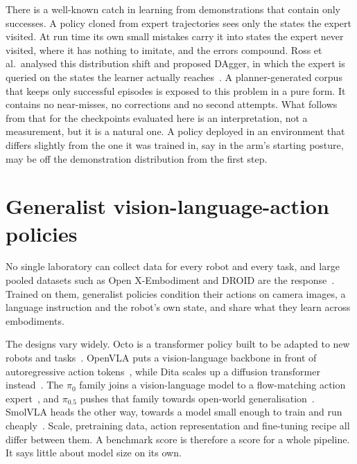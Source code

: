 There is a well-known catch in learning from demonstrations that contain only successes. A policy cloned from expert trajectories sees only the states the expert visited. At run time its own small mistakes carry it into states the expert never visited, where it has nothing to imitate, and the errors compound. Ross et al.\ analysed this distribution shift and proposed DAgger, in which the expert is queried on the states the learner actually reaches~\cite{ross2011dagger}. A planner-generated corpus that keeps only successful episodes is exposed to this problem in a pure form. It contains no near-misses, no corrections and no second attempts. What follows from that for the checkpoints evaluated here is an interpretation, not a measurement, but it is a natural one. A policy deployed in an environment that differs slightly from the one it was trained in, say in the arm's starting posture, may be off the demonstration distribution from the first step.

\section{Generalist vision-language-action policies}

No single laboratory can collect data for every robot and every task, and large pooled datasets such as Open X-Embodiment and DROID are the response~\cite{open_x_embodiment_rt_x_2023,khazatsky2024droid}. Trained on them, generalist policies condition their actions on camera images, a language instruction and the robot's own state, and share what they learn across embodiments.

The designs vary widely. Octo is a transformer policy built to be adapted to new robots and tasks~\cite{octo_2023}. OpenVLA puts a vision-language backbone in front of autoregressive action tokens~\cite{kim24openvla}, while Dita scales up a diffusion transformer instead~\cite{hou2025dita}. The $\pi_0$ family joins a vision-language model to a flow-matching action expert~\cite{black2024pi0visionlanguageactionflowmodel}, and $\pi_{0.5}$ pushes that family towards open-world generalisation~\cite{intelligence2025pi05visionlanguageactionmodelopenworld}. SmolVLA heads the other way, towards a model small enough to train and run cheaply~\cite{shukor2025smolvlavisionlanguageactionmodelaffordable}. Scale, pretraining data, action representation and fine-tuning recipe all differ between them. A benchmark score is therefore a score for a whole pipeline. It says little about model size on its own.

